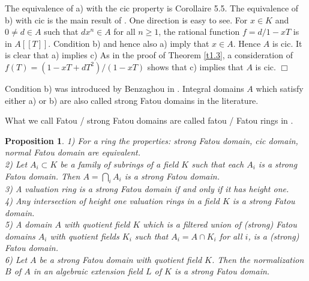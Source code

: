 \documentclass[12pt,leqno]{article}
\newtheorem{prop}[theorem]{Proposition}
\newenvironment{rem}{\noindent {\bf Remark}}{}
\newenvironment{proof}{\noindent {\bf Proof}}{\mbox{}\hspace*{\fill}$\Box$}
\begin{document}
\begin{proof}
The equivalence of a) with the cic property is \cite{CC} Corollaire 5.5. The equivalence of b) with cic is the main result of \cite{C1}. One direction is easy to see. For $x \in K$ and $0 \neq d \in A$ such that $dx^n\in A$ for all $n \ge 1$, the rational function $f = d / 1 - xT$ is in $A [[T]]$. Condition b) and hence also a) imply that $x \in A$. Hence $A$ is cic. It is clear that a) implies c) As in the proof of Theorem \ref{t1.3}, a consideration of $f (T) = (1 - xT + dT^2) / (1 - xT)$ shows that c) implies that $A$ is cic. 
\end{proof}

Condition b) was introduced by Benzaghou in \cite{B}. Integral domains $A$ which satisfy either a) or b) are also called strong Fatou domains in the literature.

\begin{rem}
What we call Fatou / strong Fatou domains are called fatou / Fatou rings in \cite{CC}.
\end{rem}

\begin{prop} \label{t1.7n}
1) For a ring the properties: strong Fatou domain, cic domain, normal Fatou domain are equivalent.\\
2) Let $A_i \subset K$ be a family of subrings of a field $K$ such that each $A_i$ is a strong Fatou domain. Then $A = \bigcap_i A_i$ is a strong Fatou domain.\\
3) A valuation ring is a strong Fatou domain if and only if it has height one.\\
4) Any intersection of height one valuation rings in a field $K$ is a strong Fatou domain.\\
5) A domain $A$ with quotient field $K$ which is a filtered union of (strong) Fatou domains $A_i$ with quotient fields $K_i$ such that $A_i = A \cap K_i$ for all $i$, is a (strong) Fatou domain. \\
6) Let $A$ be a strong Fatou domain with quotient field $K$. Then the normalization $B$ of $A$ in an algebraic extension field $L$ of $K$ is a strong Fatou domain.
\end{prop}
\end{document}

